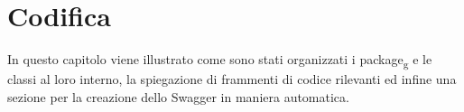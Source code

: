 \chapter{Codifica}
\label{cap:codifica}

In questo capitolo viene illustrato come sono stati organizzati i package\textsubscript{g} e le classi al loro interno, la spiegazione di frammenti di codice rilevanti ed infine una sezione per la creazione dello Swagger in maniera automatica.\\








